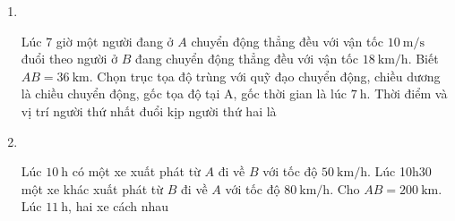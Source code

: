 \begin{enumerate}[label=\bfseries Câu \arabic*:]
{}

\item {}\\
{Lúc 7 giờ một người đang ở $A$ chuyển động thẳng đều với vận tốc $\SI{10}{\meter/\second}$ đuổi theo người ở $B$ đang chuyển động thẳng đều với vận tốc $\SI{18}{\kilo\meter/\hour}$. Biết $AB =\SI{36}{\kilo\meter}$. Chọn trục tọa độ trùng với quỹ đạo chuyển động, chiều dương là chiều chuyển động, gốc tọa độ tại A, gốc thời gian là lúc $\SI{7}{\hour}$. Thời điểm và vị trí người thứ nhất đuổi kịp người thứ hai là
}

\item {}\\
{Lúc $\SI{10}{\hour}$ có một xe xuất phát từ $A$ đi về $B$ với tốc độ $\SI{50}{\kilo\meter/\hour}$. Lúc 10h30 một xe khác xuất phát từ $B$ đi về $A$ với tốc độ $\SI{80}{\kilo\meter/\hour}$. Cho $AB =\SI{200}{\kilo\meter}$. Lúc $\SI{11}{\hour}$, hai xe cách nhau
}


\end{enumerate}
